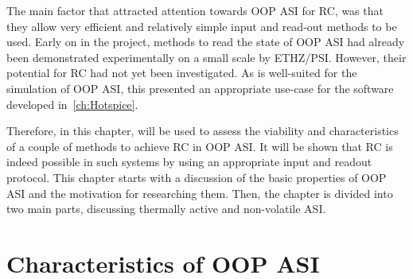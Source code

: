 The main factor that attracted attention towards OOP ASI for RC, was that they allow very efficient and relatively simple input and read-out methods to be used.
Early on in the \spinengine project, methods to read the state of OOP ASI had already been demonstrated experimentally on a small scale by ETHZ/PSI.
However, their potential for RC had not yet been investigated.
As \hotspice is well-suited for the simulation of OOP ASI, this presented an appropriate use-case for the software developed in~\cref{ch:Hotspice}. \par %
Therefore, in this chapter, \hotspice will be used to assess the viability and characteristics of a couple of methods to achieve RC in OOP ASI.
It will be shown that RC is indeed possible in such systems by using an appropriate input and readout protocol.
This chapter starts with a discussion of the basic properties of OOP ASI and the motivation for researching them.
Then, the chapter is divided into two main parts, discussing thermally active and non-volatile ASI. %
\section{Characteristics of OOP ASI}
